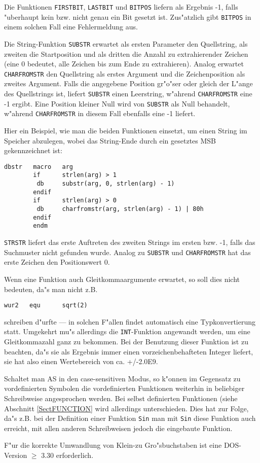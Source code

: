 \documentclass[12pt,a4paper,twoside]{report}
\newcommand{\tty}[1]{{\tt #1}}
\begin{document}
Die Funktionen \tty{FIRSTBIT}, \tty{LASTBIT} und \tty{BITPOS} liefern
als Ergebnis -1, falls "uberhaupt kein bzw. nicht genau ein Bit gesetzt
ist. Zus"atzlich gibt \tty{BITPOS} in einem solchen Fall eine
Fehlermeldung aus.
\par
Die String-Funktion \tty{SUBSTR} erwartet als ersten Parameter den
Quellstring, als zweiten die Startposition und als dritten die Anzahl zu
extrahierender Zeichen (eine 0 bedeutet, alle Zeichen bis zum Ende zu
extrahieren).  Analog erwartet \tty{CHARFROMSTR} den Quellstring als
erstes Argument und die Zeichenposition als zweites Argument.  Falls die
angegebene Position gr"o"ser oder gleich der L"ange des Quellstrings ist,
liefert \tty{SUBSTR} einen Leerstring, w"ahrend \tty{CHARFROMSTR} eine -1
ergibt.  Eine Position kleiner Null wird von \tty{SUBSTR} als Null
behandelt, w"ahrend \tty{CHARFROMSTR} in diesem Fall ebenfalls eine -1
liefert.

Hier ein Beispiel, wie man die beiden Funktionen einsetzt, um einen
String im Speicher abzulegen, wobei das String-Ende durch ein gesetztes
MSB gekennzeichnet ist:

\begin{verbatim}
dbstr   macro   arg
        if      strlen(arg) > 1
         db     substr(arg, 0, strlen(arg) - 1)
        endif
        if      strlen(arg) > 0
         db     charfromstr(arg, strlen(arg) - 1) | 80h
        endif
        endm
\end{verbatim}

\tty{STRSTR} liefert das erste Auftreten des zweiten Strings
im ersten bzw. -1, falls das Suchmuster nicht gefunden wurde.
Analog zu \tty{SUBSTR} und \tty{CHARFROMSTR} hat das erste
Zeichen den Positionswert 0.

Wenn eine Funktion auch Gleitkommaargumente erwartet, so soll
dies nicht bedeuten, da"s man nicht z.B.
\begin{verbatim}
wur2   equ      sqrt(2)
\end{verbatim}
schreiben d"urfte --- in solchen F"allen findet automatisch eine
Typkonvertierung statt.  Umgekehrt mu"s allerdings die \tty{INT}-Funktion
angewandt werden, um eine Gleitkommazahl ganz zu bekommen.  Bei der
Benutzung dieser Funktion ist zu beachten, da"s sie als Ergebnis
immer einen vorzeichenbehafteten Integer liefert, sie hat also
einen Wertebereich von ca. +/-2.0E9.
\par
Schaltet man AS in den case-sensitiven Modus, so k"onnen im
Gegensatz zu vordefinierten Symbolen die vordefinierten Funktionen
weiterhin in beliebiger Schreibweise angesprochen werden.  Bei
selbst definierten Funktionen (siehe Abschnitt \ref{SectFUNCTION}
wird allerdings unterschieden.  Dies  hat zur Folge, da"s z.B. bei
der Definition einer Funktion \tty{Sin} man mit \tty{Sin} diese
Funktion auch erreicht, mit allen anderen Schreibweisen jedoch die
eingebaute Funktion.
\par
F"ur die korrekte Umwandlung  von Klein-zu
Gro"sbuchstaben ist eine DOS-Version $\geq$ 3.30
erforderlich.
\end{document}
